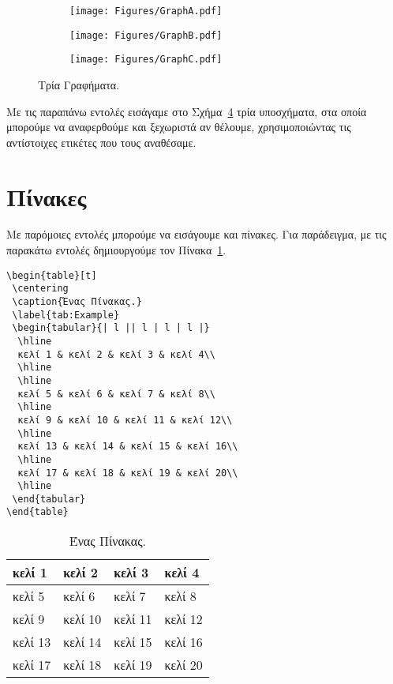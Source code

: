 \begin{figure}[t]
	\centering
	\begin{subfigure}[t]{0.3\textwidth}
		\centering
		\texttt{[image: Figures/GraphA.pdf]}
		\caption{}
		\label{subfig:GraphA}
	\end{subfigure}
	\hfill
	\begin{subfigure}[t]{0.3\textwidth}
		\centering
		\texttt{[image: Figures/GraphB.pdf]}
		\caption{}
		\label{subfig:GraphB}
	\end{subfigure}
	\hfill
	\begin{subfigure}[t]{0.3\textwidth}
		\centering
		\texttt{[image: Figures/GraphC.pdf]}
		\caption{}
		\label{subfig:GraphC}
	\end{subfigure}
	\caption{Τρία Γραφήματα.}
	\label{fig:ThreeGraphs}
\end{figure}

Με τις παραπάνω εντολές εισάγαμε στο Σχήμα~\ref{fig:ThreeGraphs} τρία 
υποσχήματα, στα οποία μπορούμε να αναφερθούμε και ξεχωριστά αν θέλουμε, 
χρησιμοποιώντας τις αντίστοιχες ετικέτες που τους αναθέσαμε.


\section{Πίνακες}
\label{sec:Tables}
Με παρόμοιες εντολές μπορούμε να εισάγουμε και πίνακες. Για παράδειγμα, με τις 
παρακάτω εντολές δημιουργούμε τον Πίνακα~\ref{tab:Example}.

\begin{verbatim}
\begin{table}[t]
 \centering
 \caption{Ένας Πίνακας.}
 \label{tab:Example}
 \begin{tabular}{| l || l | l | l |}
  \hline
  κελί 1 & κελί 2 & κελί 3 & κελί 4\\
  \hline
  \hline
  κελί 5 & κελί 6 & κελί 7 & κελί 8\\
  \hline
  κελί 9 & κελί 10 & κελί 11 & κελί 12\\
  \hline
  κελί 13 & κελί 14 & κελί 15 & κελί 16\\
  \hline
  κελί 17 & κελί 18 & κελί 19 & κελί 20\\
  \hline
 \end{tabular}
\end{table}
\end{verbatim}

\begin{table}[t]
	\centering
	\caption{Ένας Πίνακας.}
	\label{tab:Example}
	\begin{tabular}{| l || l | l | l |}
		\hline
		κελί 1 & κελί 2 & κελί 3 & κελί 4\\
		\hline
		\hline
		κελί 5 & κελί 6 & κελί 7 & κελί 8\\
		\hline
		κελί 9 & κελί 10 & κελί 11 & κελί 12\\
		\hline
		κελί 13 & κελί 14 & κελί 15 & κελί 16\\
		\hline
		κελί 17 & κελί 18 & κελί 19 & κελί 20\\
		\hline
	\end{tabular}
\end{table}


